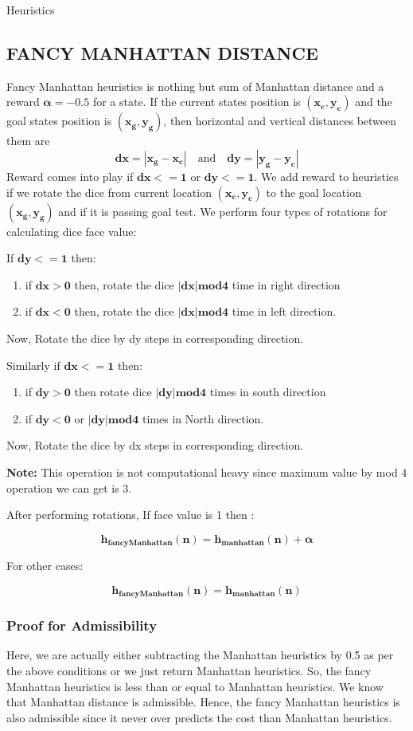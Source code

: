 \documentclass[12pt]{article}
\begin{document}
\begin{section}{Heuristics}
\subsection{FANCY MANHATTAN DISTANCE}
Fancy Manhattan heuristics is nothing but sum of Manhattan distance and a reward $\mathbf{\alpha = -0.5}$ for a state.
 If the current state\textsc{}s position is $\mathbf{(x_c, y_c)}$ and the goal state\textsc{}s position is $\mathbf{(x_g, y_g)}$, then horizontal and vertical distances between them are
 \[
 {\mathbf{dx =|x_g-x_c|  }  \quad \textrm{and} \quad \mathbf{dy =|y_g-y_c| } } 
\]
Reward comes into play if $\mathbf{dx <=1}$ or $\mathbf{dy <= 1}$. We add reward to heuristics if we rotate the dice from current location $\mathbf{(x_c, y_c)}$ to the goal location $\mathbf{(x_g, y_g)}$ and if it is passing goal test. We perform four types of rotations for calculating dice face value:
\par
If $\mathbf{dy<=1}$ then:
\begin{enumerate}
\item{if $\mathbf{dx>0}$ then, rotate the dice $\mathbf{|dx|mod 4}$ time in right direction}
\item{if $\mathbf{dx<0}$ then, rotate the dice $\mathbf{|dx|mod 4}$ time in left direction.}
\end{enumerate}
Now, Rotate the dice by dy steps in corresponding direction.
\par
Similarly if $\mathbf{dx<=1}$  then:
\begin{enumerate}
\item{
if $\mathbf{dy>0}$ then rotate dice $\mathbf{|dy| mod 4}$ times in south direction }
\item{
if $\mathbf{dy<0}$ or $\mathbf{|dy|mod 4}$ times in North direction.}
\end{enumerate}
Now, Rotate the dice by dx steps in corresponding direction.\par
\textbf{Note:} This operation is not computational heavy since maximum value by mod 4 operation we can get is 3. 
\par
After performing rotations, If face value is 1 then :
\par
 \[
 {\mathbf{h_{fancyManhattan}(n) = h_{manhattan}(n) + \alpha}} 
\]
\par
For other cases:
\par
 \[
 {\mathbf{h_{fancyManhattan}(n) = h_{manhattan}(n) }} 
\]

\subsubsection{Proof for Admissibility}

Here, we are actually either subtracting the Manhattan heuristics by 0.5 as per the above conditions or we just return Manhattan heuristics. So, the fancy Manhattan heuristics is less than or equal to Manhattan heuristics. We know that Manhattan distance is admissible. 
Hence, the fancy Manhattan heuristics is also admissible since it never over predicts the cost than Manhattan heuristics.

\end{section}
 
\end{document}
